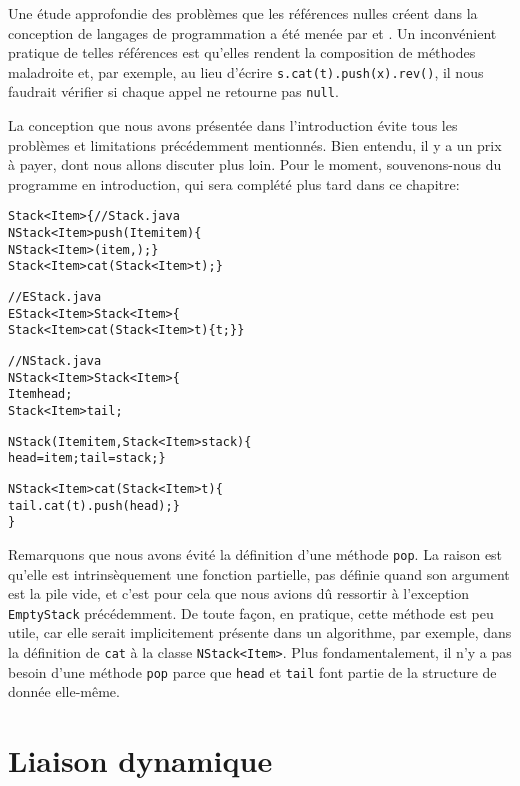 Une étude approfondie des problèmes que les références nulles créent
dans la conception de langages de programmation a été menée par
\cite{ChalinJames_2007,Cobbe_2008} et \cite{Hoare_2009}. Un
inconvénient pratique de telles références est qu'elles rendent la
composition de méthodes maladroite et, par exemple, au lieu d'écrire
\texttt{s.cat(t).push(x).rev()}, il nous faudrait vérifier si chaque
appel ne retourne pas \texttt{null}.

La conception que nous avons présentée dans l'introduction évite tous
les problèmes et limitations précédemment mentionnés. Bien entendu, il
y a un prix à payer, dont nous allons discuter plus loin. Pour le
moment, souvenons-nous du programme \Java en introduction, qui sera
complété plus tard dans ce chapitre:
\begin{alltt}
\public \abstractX \class Stack<Item> \{\hfill// Stack.java
  \public \final NStack<Item> push(\final Item item) \{
    \return \new NStack<Item>(item,\this); \}
  \public \abstractX Stack<Item> cat(\final Stack<Item> t); \}

// EStack.java
\public \final \class EStack<Item> \extends Stack<Item> \{
  \public Stack<Item> cat(\final Stack<Item> t) \{ \return t; \}\}

// NStack.java
\public \final \class NStack<Item> \extends Stack<Item> \{
  \private \final Item head;
  \private \final Stack<Item> tail;

  \public NStack(\final Item item, \final Stack<Item> stack) \{
    head = item; tail = stack; \}

  \public NStack<Item> cat(\final Stack<Item> t) \{
    \return tail.cat(t).push(head); \}
\}
\end{alltt}
Remarquons que nous avons évité la définition d'une méthode
\texttt{pop}. La raison est qu'elle est intrinsèquement une fonction
partielle, pas définie quand son argument est la pile vide, et c'est
pour cela que nous avions dû ressortir à l'exception
\texttt{EmptyStack} précédemment. De toute façon, en pratique, cette
méthode est peu utile, car elle serait implicitement présente dans un
algorithme, par exemple, dans la définition de \texttt{cat} à la
classe \texttt{NStack<Item>}. Plus fondamentalement, il n'y a pas
besoin d'une méthode \texttt{pop} parce que \texttt{head} et
\texttt{tail} font partie de la structure de donnée elle-même.

\section{Liaison dynamique}
\label{sec_single_dispatch}

